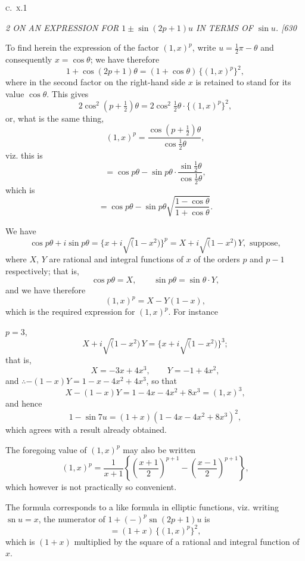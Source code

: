 \documentclass[12pt,a4paper]{article}
\newcommand{\sn}{\operatorname{sn}}
\begin{document}
\hfill\textsc{c.~x.}\hspace{2em}1

\clearpage
\setcounter{page}{2}

\begin{center}
\textit{2 \hfill ON AN EXPRESSION FOR $1 \pm \sin(2p+1)u$ IN TERMS OF $\sin u$. \hfill [630}
\end{center}

To find herein the expression of the factor $(1, x)^p$, write $u = \tfrac{1}{2}\pi - \theta$ and consequently $x = \cos\theta$; we have therefore
\[
1 + \cos(2p+1)\theta = (1+\cos\theta)\,\{(1, x)^p\}^2,
\]
where in the second factor on the right-hand side $x$ is retained to stand for its value $\cos\theta$. This gives
\[
2\cos^2\!\left(p+\tfrac{1}{2}\right)\!\theta = 2\cos^2\!\tfrac{1}{2}\theta \cdot \{(1, x)^p\}^2,
\]
or, what is the same thing,
\[
(1, x)^p = \frac{\cos\!\left(p+\tfrac{1}{2}\right)\!\theta}{\cos\tfrac{1}{2}\theta},
\]
viz. this is
\[
= \cos p\theta - \sin p\theta \cdot \frac{\sin\tfrac{1}{2}\theta}{\cos\tfrac{1}{2}\theta},
\]
which is
\[
= \cos p\theta - \sin p\theta \sqrt{\frac{1-\cos\theta}{1+\cos\theta}}.
\]

We have
\[
\cos p\theta + i\sin p\theta = \{x + i\surd(1-x^2)\}^p = X + i\surd(1-x^2)\, Y, \text{ suppose},
\]
where $X$, $Y$ are rational and integral functions of $x$ of the orders $p$ and $p-1$ respectively; that is,
\[
\cos p\theta = X, \qquad \sin p\theta = \sin\theta \cdot Y,
\]
and we have therefore
\[
(1, x)^p = X - Y(1-x),
\]
which is the required expression for $(1, x)^p$. For instance

$p=3$,
\[
X + i\surd(1-x^2)\, Y = \{x + i\surd(1-x^2)\}^3;
\]
that is,
\[
X = -3x + 4x^3, \qquad Y = -1 + 4x^2,
\]
and $\therefore -(1-x)Y = 1 - x - 4x^2 + 4x^3$, so that
\[
X - (1-x)Y = 1 - 4x - 4x^2 + 8x^3 = (1, x)^3,
\]
and hence
\[
1 - \sin 7u = (1+x)(1 - 4x - 4x^2 + 8x^3)^2,
\]
which agrees with a result already obtained.

The foregoing value of $(1, x)^p$ may also be written
\[
(1, x)^p = \frac{1}{x+1} \left\{ \left( \frac{x+1}{2} \right)^{\!p+1} - \left( \frac{x-1}{2} \right)^{\!p+1} \right\},
\]
which however is not practically so convenient.

The formula corresponds to a like formula in elliptic functions, viz. writing $\sn u = x$, the numerator of $1 + (-)^p \sn(2p+1)u$ is
\[
= (1+x)\,\{(1, x)^p\}^2,
\]
which is $(1+x)$ multiplied by the square of a rational and integral function of $x$.

\clearpage
\setcounter{page}{3}
\end{document}
